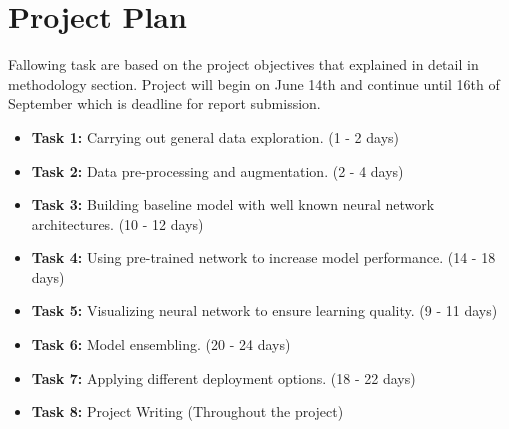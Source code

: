 \documentclass[12pt, twoside, a4paper]{article}
\begin{document}
\section{Project Plan}
Fallowing task are based on the project objectives that explained in detail in methodology section. Project will begin on June 14th and continue until 16th of September which is deadline for report submission.

\begin{itemize}
    \item \textbf{Task 1: }Carrying out general data exploration. (1 - 2 days)
    \item \textbf{Task 2: }Data pre-processing and augmentation. (2 - 4 days)
    \item \textbf{Task 3: }Building baseline model with well known neural network architectures. (10 - 12 days)
    \item \textbf{Task 4: }Using pre-trained network to increase model performance. (14 - 18 days)
    \item \textbf{Task 5: }Visualizing neural network to ensure learning quality. (9 - 11 days)
    \item \textbf{Task 6: }Model ensembling. (20 - 24 days)
    \item \textbf{Task 7: }Applying different deployment options. (18 - 22 days)
    \item \textbf{Task 8: }Project Writing (Throughout the project)
\end{itemize}

\noindent{}

\clearpage

\printbibliography
{}
\end{document}
